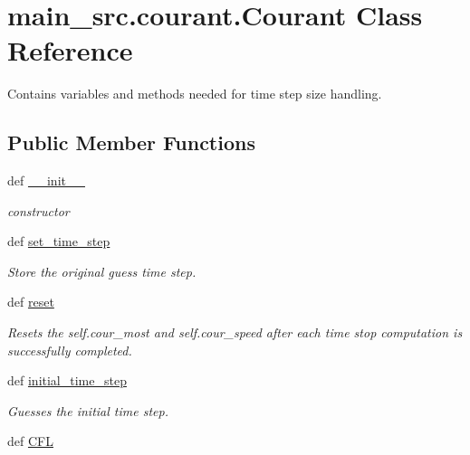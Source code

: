 \hypertarget{classmain__src_1_1courant_1_1Courant}{\section{main\-\_\-src.\-courant.\-Courant Class Reference}
\label{classmain__src_1_1courant_1_1Courant}
}


Contains variables and methods needed for time step size handling.  


\subsection*{Public Member Functions}
\begin{DoxyCompactItemize}
\item 
\hypertarget{classmain__src_1_1courant_1_1Courant_a702d443c3654b3042b9186777a168e32}{def \hyperlink{classmain__src_1_1courant_1_1Courant_a702d443c3654b3042b9186777a168e32}{\-\_\-\-\_\-init\-\_\-\-\_\-}}\label{classmain__src_1_1courant_1_1Courant_a702d443c3654b3042b9186777a168e32}

\begin{DoxyCompactList}\small\item\em constructor \end{DoxyCompactList}\item 
\hypertarget{classmain__src_1_1courant_1_1Courant_ad2665092130776c992abffb3bebad129}{def \hyperlink{classmain__src_1_1courant_1_1Courant_ad2665092130776c992abffb3bebad129}{set\-\_\-time\-\_\-step}}\label{classmain__src_1_1courant_1_1Courant_ad2665092130776c992abffb3bebad129}

\begin{DoxyCompactList}\small\item\em Store the original guess time step. \end{DoxyCompactList}\item 
\hypertarget{classmain__src_1_1courant_1_1Courant_a599825515b0fe373cd1320ae8e7e23da}{def \hyperlink{classmain__src_1_1courant_1_1Courant_a599825515b0fe373cd1320ae8e7e23da}{reset}}\label{classmain__src_1_1courant_1_1Courant_a599825515b0fe373cd1320ae8e7e23da}

\begin{DoxyCompactList}\small\item\em Resets the self.\-cour\-\_\-most and self.\-cour\-\_\-speed after each time stop computation is successfully completed. \end{DoxyCompactList}\item 
def \hyperlink{classmain__src_1_1courant_1_1Courant_ac9a61489346a9d6a735160ecdaa2ccb7}{initial\-\_\-time\-\_\-step}
\begin{DoxyCompactList}\small\item\em Guesses the initial time step. \end{DoxyCompactList}\item 
\hypertarget{classmain__src_1_1courant_1_1Courant_aafcc20291c06047f9623849828d4e076}{def \hyperlink{classmain__src_1_1courant_1_1Courant_aafcc20291c06047f9623849828d4e076}{C\-F\-L}}\label{classmain__src_1_1courant_1_1Courant_aafcc20291c06047f9623849828d4e076}


\end{DoxyCompactItemize}
